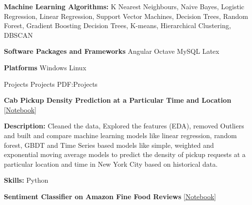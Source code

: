 \documentclass[letterpaper,MMMyyyy,nonstopmode]{simpleresumecv}
\begin{document}
\begin{Body}
            
        \BigGap

            
        \Entry
            \textbf{Machine Learning Algorithms:}
            K Nearest Neighbours, Naive Bayes, Logistic Regression, 
            Linear Regression, Support Vector Machines, Decision Trees, 
            Random Forest, Gradient Boosting Decision Trees, K-means, 
            Hierarchical Clustering, DBSCAN
        
        
        \BigGap
        
        
        \Entry
            \textbf{Software Packages and Frameworks}
                \SubBulletItem
                    Angular
                \SubBulletItem
                    Octave
                \SubBulletItem
                    MySQL
                \SubBulletItem
                    Latex       
        

        \BigGap

        
        \Entry
            \textbf{Platforms}
                \SubBulletItem
                    Windows
                \SubBulletItem
                    Linux
    
    
    
    \Section
    {Projects}
    {Projects}
    {PDF:Projects}
    
        \Entry
            \textbf{Cab Pickup Density Prediction at a Particular Time and Location}
            [\href{http://bit.ly/PickupDensity}{Notebook}]

            \Gap

            \Item
                \textbf{Description:}
                Cleaned the data, Explored the features (EDA), 
                removed Outliers and built and compare machine learning models 
                like  linear regression, random forest, GBDT and Time Series 
                based models like simple, weighted and exponential moving average 
                models to predict the density of pickup requests at a 
                particular location and time in New York City based on historical data.
            
            \Gap

            \Item
                \textbf{Skills:}
                Python
        
        
        \BigGap
        
        \Entry
            \textbf{Sentiment Classifier on Amazon Fine Food Reviews}
            [\href{http://bit.ly/AmznSentimentClassifier}{Notebook}]


\end{Body}
\end{document}
